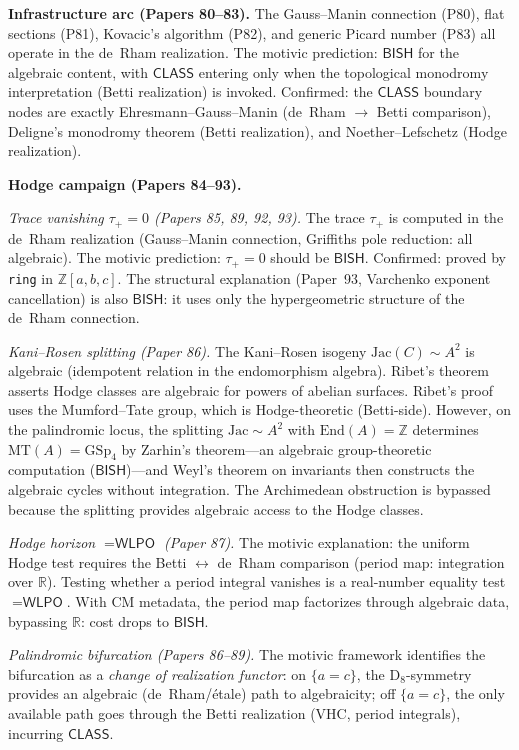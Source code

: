 \documentclass[11pt,a4paper]{article}
\theoremstyle{plain}
\theoremstyle{definition}
\newcommand{\BISH}{\textsf{BISH}}
\newcommand{\WLPO}{\textsf{WLPO}}
\newcommand{\CLASS}{\textsf{CLASS}}
\newcommand{\Z}{\mathbb{Z}}
\newcommand{\R}{\mathbb{R}}
\begin{document}
\medskip
\noindent\textbf{Infrastructure arc (Papers 80--83).} The Gauss--Manin connection (P80), flat sections (P81), Kovacic's algorithm (P82), and generic Picard number (P83) all operate in the de~Rham realization. The motivic prediction: $\BISH$ for the algebraic content, with $\CLASS$ entering only when the topological monodromy interpretation (Betti realization) is invoked. Confirmed: the $\CLASS$ boundary nodes are exactly Ehresmann--Gauss--Manin (de~Rham $\to$ Betti comparison), Deligne's monodromy theorem (Betti realization), and Noether--Lefschetz (Hodge realization).

\medskip
\noindent\textbf{Hodge campaign (Papers 84--93).}

\emph{Trace vanishing $\tau_+ = 0$ (Papers 85, 89, 92, 93).} The trace $\tau_+$ is computed in the de~Rham realization (Gauss--Manin connection, Griffiths pole reduction: all algebraic). The motivic prediction: $\tau_+ = 0$ should be $\BISH$. Confirmed: proved by \texttt{ring} in $\Z[a,b,c]$. The structural explanation (Paper~93, Varchenko exponent cancellation) is also $\BISH$: it uses only the hypergeometric structure of the de~Rham connection.

\emph{Kani--Rosen splitting (Paper 86).} The Kani--Rosen isogeny $\mathrm{Jac}(C) \sim A^2$ is algebraic (idempotent relation in the endomorphism algebra). Ribet's theorem asserts Hodge classes are algebraic for powers of abelian surfaces. Ribet's proof uses the Mumford--Tate group, which is Hodge-theoretic (Betti-side). However, on the palindromic locus, the splitting $\mathrm{Jac} \sim A^2$ with $\mathrm{End}(A) = \Z$ determines $\mathrm{MT}(A) = \mathrm{GSp}_4$ by Zarhin's theorem---an algebraic group-theoretic computation ($\BISH$)---and Weyl's theorem on invariants then constructs the algebraic cycles without integration. The Archimedean obstruction is bypassed because the splitting provides algebraic access to the Hodge classes.

\emph{Hodge horizon $= \WLPO$ (Paper 87).} The motivic explanation: the uniform Hodge test requires the Betti $\leftrightarrow$ de~Rham comparison (period map: integration over $\R$). Testing whether a period integral vanishes is a real-number equality test $= \WLPO$. With CM metadata, the period map factorizes through algebraic data, bypassing $\R$: cost drops to $\BISH$.

\emph{Palindromic bifurcation (Papers 86--89).} The motivic framework identifies the bifurcation as a \emph{change of realization functor}: on $\{a = c\}$, the D$_8$-symmetry provides an algebraic (de~Rham/\'etale) path to algebraicity; off $\{a = c\}$, the only available path goes through the Betti realization (VHC, period integrals), incurring $\CLASS$.
\end{document}
